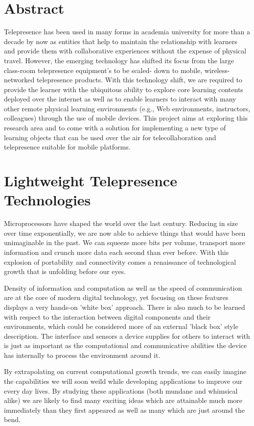 \documentclass[a4paper,12pt]{report}
\begin{document}
\chapter*{\centering Abstract}
Telepresence has been used in many forms in academia university for more than a decade by now as entities that help to maintain the relationship with learners and provide them with collaborative experiences without the expense of physical travel. However, the emerging technology has shifted its focus from the large class-room telepresence equipment’s to be scaled- down to mobile, wireless-networked telepresence products. With this technology shift, we are required to provide the learner with the ubiquitous ability to explore core learning contents deployed over the internet as well as to enable learners to interact with many other remote physical learning environments (e.g., Web environments, instructors, colleagues) through the use of mobile devices. This project aims at exploring this research area and to come with a solution for implementing a new type of learning objects that can be used over the air for telecollaboration and telepresence suitable for mobile platforms. 

\chapter{Lightweight Telepresence Technologies}

Microprocessors have shaped the world over the last century. Reducing in size over time exponentially, we are now able to achieve things that would have been unimaginable in the past. We can squeeze more bits per volume, transport more information and crunch more data each second than ever before. With this explosion of portability and connectivity comes a renaissance of technological growth that is unfolding before our eyes.

Density of information and computation as well as the speed of communication are at the core of modern digital technology, yet focusing on these features displays a very hands-on 'white box' approach. There is also much to be learned with respect to the interaction between digital components and their environments, which could be considered more of an external 'black box' style description. The interface and sensors a device supplies for others to interact with is just as important as the computational and communicative abilities the device has internally to process the environment around it.

By extrapolating on current computational growth trends, we can easily imagine the capabilities we will soon weild while developing applications to improve our every day lives. By studying these applications (both mundane and whimsical alike) we are likely to find many exciting ideas which are attainable much more immediately than they first appeared as well as many which are just around the bend.
\end{document}

